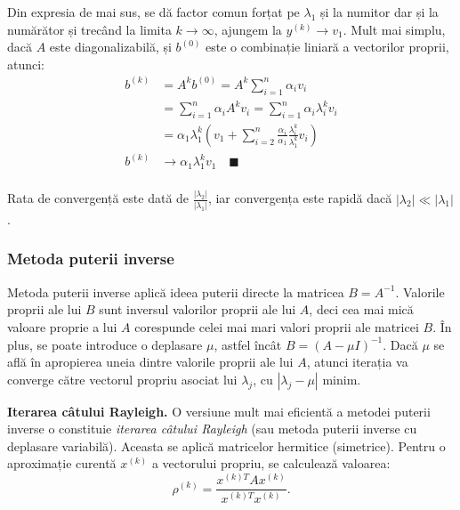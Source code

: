 \documentclass{exam}
\begin{document}
Din expresia de mai sus, se dă factor comun forțat pe $\lambda_1$ și la numitor
dar și la numărător și trecând la limita $k \to \infty$, ajungem la $y^{(k)} \to v_1$.
Mult mai simplu, dacă $A$ este diagonalizabilă, și $b^{(0)}$ este o combinație
liniară a vectorilor proprii, atunci:
\begin{align*}
	b^{(k)} & = A^k b^{(0)} = A^k \sum_{i=1}^n \alpha_i v_i                                                               \\
	        & = \sum_{i=1}^n \alpha_i A^k v_i = \sum_{i=1}^n \alpha_i \lambda_i^k v_i                                     \\
	        & = \alpha_1 \lambda_1^k ( v_1 +  \sum_{i=2}^n \frac{\alpha_i}{\alpha_1} \frac{\lambda_i^k}{\lambda_1^k} v_i) \\
	b^{(k)} & \to \alpha_1 \lambda_1^k v_1 \quad \blacksquare                                                             \\
\end{align*}

Rata de convergență este dată de $\frac{|\lambda_2|}{|\lambda_1|}$, iar
convergența este rapidă dacă $|\lambda_2| \ll |\lambda_1|$.

\subsubsection{Metoda puterii inverse}

Metoda puterii inverse aplică ideea puterii directe la matricea
$B = A^{-1}$. Valorile proprii ale lui $B$ sunt inversul valorilor proprii ale lui
$A$, deci cea mai mică valoare proprie a lui $A$ corespunde celei mai mari
valori proprii ale matricei $B$. În plus, se poate introduce o deplasare $\mu$,
astfel încât $B = (A - \mu I)^{-1}$. Dacă $\mu$ se află în apropierea uneia
dintre valorile proprii ale lui $A$, atunci iterația va converge către vectorul
propriu asociat lui $\lambda_j$, cu $|\lambda_j - \mu|$ minim.

\textbf{Iterarea câtului Rayleigh.} O versiune mult mai eficientă a metodei
puterii inverse o constituie \textit{iterarea câtului Rayleigh} (sau metoda
puterii inverse cu deplasare variabilă). Aceasta se aplică matricelor hermitice
(simetrice). Pentru o aproximație curentă $x^{(k)}$
a vectorului propriu, se calculează valoarea:
\begin{equation*}
	\rho^{(k)} = \frac{x^{(k) T} A x^{(k)}}{x^{(k) T} x^{(k)}}.
\end{equation*}
\end{document}
